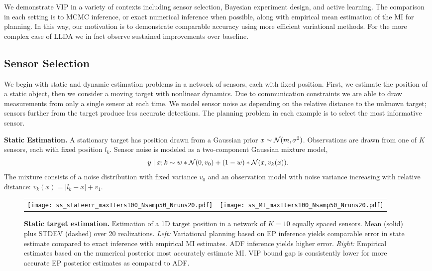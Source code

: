 We demonstrate VIP in a variety of contexts including sensor
selection, Bayesian experiment design, and active learning.  The
comparison in each setting is to MCMC inference, or exact numerical
inference when possible, along with empirical mean estimation of the
MI for planning.  In this way, our motivation is to demonstrate
comparable accuracy using more efficient variational methods.  For the
more complex case of LLDA we in fact observe sustained improvements
over baseline.

\subsection{Sensor Selection}

We begin with static and dynamic estimation problems in a network of
sensors, each with fixed position.  First, we estimate the position of
a static object, then we consider a moving target with nonlinear
dynamics.  Due to communication constraints we are able to draw
measurements from only a single sensor at each time.  We model sensor
noise as depending on the relative distance to the unknown target;
sensors further from the target produce less accurate detections.  The
planning problem in each example is to select the most informative
sensor.

\textbf{Static Estimation.}  A stationary target has position drawn
from a Gaussian prior $x \sim \mathcal{N}(m,\sigma^2)$.  Observations are
drawn from one of $K$ sensors, each with fixed position $l_k$.  Sensor
noise is modeled as a two-component Gaussian mixture model,
\[
  y \mid x; k \sim w * \mathcal{N}(0, v_0) + (1-w) * \mathcal{N}(x, v_k(x)).
\]
The mixture consists of a noise distribution with fixed variance $v_0$
and an observation model with noise variance increasing with relative
distance: \mbox{$v_k(x) = |l_k - x| + v_1$}.

\begin{figure}
  \begin{tabular}{cc}
    \hspace{-3mm}\texttt{[image: ss\_stateerr\_maxIters100\_Nsamp50\_Nruns20.pdf]} &
    \hspace{-5mm}\texttt{[image: ss\_MI\_maxIters100\_Nsamp50\_Nruns20.pdf]}
  \end{tabular}
  
  \caption{\small\textbf{Static target estimation.} Estimation of a 1D
    target position in a network of $K=10$ equally spaced sensors.
    Mean (solid) plus STDEV (dashed) over 20 realizations.  \emph{Left:}
    Variational planning based on EP inference yields comparable error
    in state estimate compared to exact inference with empirical MI
    estimates. ADF inference yields higher error.  \emph{Right:}
    Empirical estimates based on the numerical posterior most
    accurately estimate MI.  VIP bound gap is consistently lower for
    more accurate EP posterior estimates as compared to
    ADF.}  \label{fig:static}
\end{figure}

